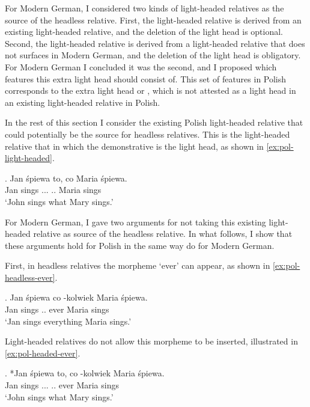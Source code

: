 For Modern German, I considered two kinds of light-headed relatives as the source of the headless relative.
First, the light-headed relative is derived from an existing light-headed relative, and the deletion of the light head is optional. Second, the light-headed relative is derived from a light-headed relative that does not surfaces in Modern German, and the deletion of the light head is obligatory.
For Modern German I concluded it was the second, and I proposed which features this extra light head should consist of. This set of features in Polish corresponds to the extra light head  or , which is not attested as a light head in an existing light-headed relative in Polish.

In the rest of this section I consider the existing Polish light-headed relative that could potentially be the source for headless relatives. This is the light-headed relative that in which the demonstrative is the light head, as shown in \ref{ex:pol-light-headed}.

\exg. Jan śpiewa to, co Maria śpiewa.\\
Jan sings ... .. Maria sings\\
`John sings what Mary sings.' \label{ex:pol-light-headed}

For Modern German, I gave two arguments for not taking this existing light-headed relative as source of the headless relative. In what follows, I show that these arguments hold for Polish in the same way do for Modern German.

First, in headless relatives the morpheme  `ever' can appear, as shown in \ref{ex:pol-headless-ever}.

\exg. Jan śpiewa co -kolwiek Maria śpiewa.\\
Jan sings .. ever Maria sings\\
`Jan sings everything Maria sings.' \label{ex:pol-headless-ever}

Light-headed relatives do not allow this morpheme to be inserted, illustrated in \ref{ex:pol-headed-ever}.

\exg. *Jan śpiewa to, co -kolwiek Maria śpiewa.\\
Jan sings ... .. ever Maria sings\\
`John sings what Mary sings.' \label{ex:pol-headed-ever}

